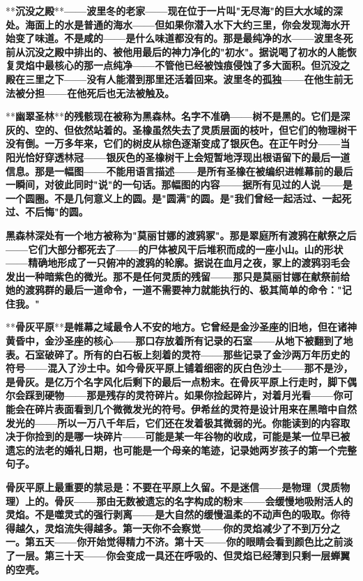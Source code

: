 \documentclass[12pt,a4paper,openany]{ctexbook}
\begin{document}
**\textbf{沉没之殿}**\textbf{——波里冬的老家——现在位于一片叫"无尽海"的巨大水域的深处。海面上的水是普通的海水——但如果你潜入水下大约三里，你会发现海水开始变了味道。不是咸的——是什么味道都没有的。那是最纯净的水——波里冬死前从沉没之殿中排出的、被他用最后的神力净化的"初水"。据说喝了初水的人能恢复灵焰中最核心的那一点纯净——不管他已经被蚀痕侵蚀了多大面积。但沉没之殿在三里之下——没有人能潜到那里还活着回来。波里冬的孤独——在他生前无法被分担——在他死后也无法被触及。}


**\textbf{幽翠圣林}**\textbf{的残骸现在被称为黑森林。名字不准确——树不是黑的。它们是深灰的、空的、但依然站着的。圣橡虽然失去了灵质层面的枝叶，但它们的物理树干没有倒。一万多年来，它们的树皮从棕色逐渐变成了银灰色。在正午时分——当阳光恰好穿透林冠——银灰色的圣橡树干上会短暂地浮现出根语留下的最后一道信息。那是一幅图——不能用语言描述——是所有圣橡在被编织进帷幕前的最后一瞬间，对彼此同时"说"的一句话。那幅图的内容——据所有见过的人说——是一个圆圈。不是几何意义上的圆。是"圆满"的圆。是"我们曾经一起活过、一起死过、不后悔"的圆。}


\textbf{黑森林深处有一个地方被称为"莫丽甘娜的渡鸦冢"。那是翠庭所有渡鸦在献祭之后——它们大部分都死去了——的尸体被风干后堆积而成的一座小山。山的形状——精确地形成了一只俯冲的渡鸦的轮廓。据说在血月之夜，冢上的渡鸦羽毛会发出一种暗紫色的微光。那不是任何灵质的残留——那只是莫丽甘娜在献祭前给她的渡鸦群的最后一道命令，一道不需要神力就能执行的、极其简单的命令："记住我。"}


**\textbf{骨灰平原}**\textbf{是帷幕之域最令人不安的地方。它曾经是金沙圣座的旧地，但在诸神黄昏中，金沙圣座的核心——那口存放着所有记录的石室——从地下被翻到了地表。石室破碎了。所有的白石板上刻着的灵符——那些记录了金沙两万年历史的符号——混入了沙土中。如今骨灰平原上铺着细密的灰白色沙土——那不是沙，是骨灰。是亿万个名字风化后剩下的最后一点粉末。在骨灰平原上行走时，脚下偶尔会踩到硬物——那是残存的灵符碎片。如果你捡起碎片，对着月光看——你可能会在碎片表面看到几个微微发光的符号。伊希丝的灵符是设计用来在黑暗中自然发光的——所以一万八千年后，它们还在发着极其微弱的光。你能读到的内容取决于你捡到的是哪一块碎片——可能是某一年谷物的收成，可能是某一位早已被遗忘的法老的婚礼日期，也可能是一个母亲的笔迹，记录她两岁孩子的第一个完整句子。}


\textbf{骨灰平原上最重要的禁忌是：不要在平原上久留。不是迷信——是物理（灵质物理）上的。骨灰——那由无数被遗忘的名字构成的粉末——会缓慢地吸附活人的灵焰。不是噬灵式的强行剥离——是大自然的缓慢温柔的不动声色的吸取。你待得越久，灵焰流失得越多。第一天你不会察觉——你的灵焰减少了不到万分之一。第五天——你开始觉得精力不济。第十天——你的眼睛会看到颜色比之前淡了一层。第三十天——你会变成一具还在呼吸的、但灵焰已经薄到只剩一层蝉翼的空壳。}
\end{document}
